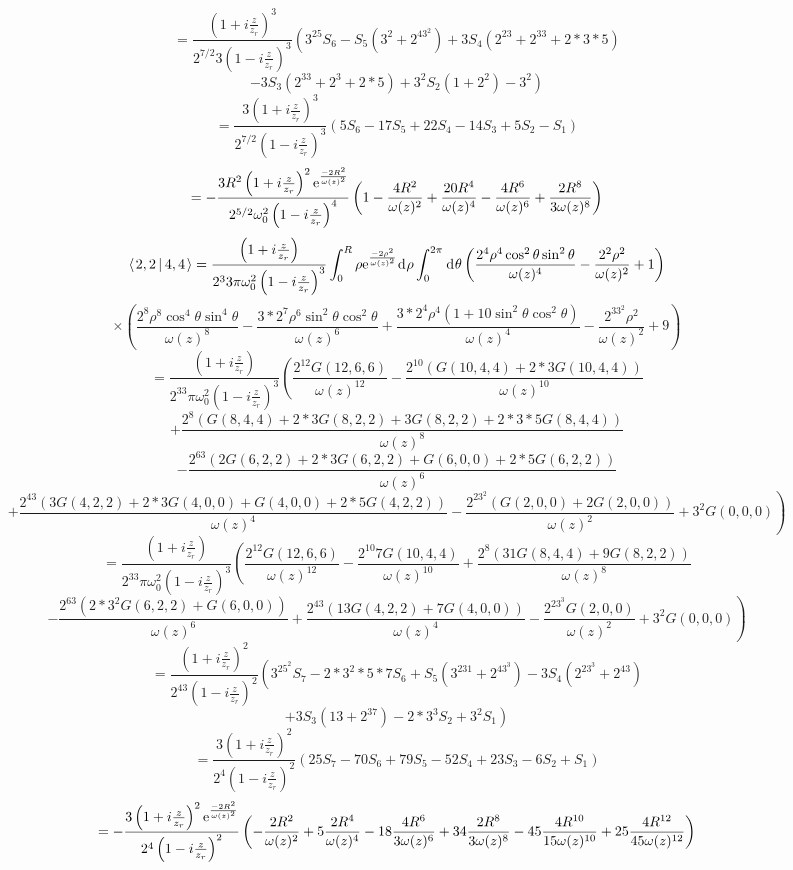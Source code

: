 \documentclass[11pt]{amsart}
\makeatletter
\newcommand{\e}{{\rm e}}				%
\newcommand{\msp}[1]{\mspace{#1mu}}		%
\newcommand{\0}{\varnothing}		%
\newcommand{\dd}{\msp{1} {\rm{d}} \msp{1}}	%
\newcommand{\brac}[2]{\left\langle\msp{2} #1\left\lvert \msp{3.5} #2 \right.\right\rangle}	%
\newcommand{\1}{!}
\newcommand{\2}{@}
\newcommand{\3}{\#}
\newcommand{\4}{\$}
\newcommand{\5}{\%}
\newcommand{\6}{$^\wedge$}
\newcommand{\7}{\&}
\newcommand{\8}{*}
\newcommand{\9}{(}
\makeatother
\begin{document}
\[
=\frac{\left(1+i\frac{z}{z_r}\right)^3}{2^{7/2}3\left(1-i\frac{z}{z_r}\right)^3}\left(3^25S_6-S_5\left(3^2+2^43^2\right)+3S_4\left(2^23+2^33+2*3*5\right)\right.
\]
\[
\left.-3S_3\left(2^33+2^3+2*5\right)+3^2S_2\left(1+2^2\right)-3^2\right)
\]
\[
=\frac{3\left(1+i\frac{z}{z_r}\right)^3}{2^{7/2}\left(1-i\frac{z}{z_r}\right)^3}\left(5S_6-17S_5+22S_4-14S_3+5S_2-S_1\right)
\]
\[
=-\frac{3R^2\left(1+i\frac{z}{z_r}\right)^2\e^{\frac{-2R^2}{\omega(z)^2}}}{2^{5/2}\omega_0^2\left(1-i\frac{z}{z_r}\right)^4}\left(1-\frac{4R^2}{\omega(z)^2}+\frac{20R^4}{\omega(z)^4}-\frac{4R^6}{\omega(z)^6}+\frac{2R^8}{3\omega(z)^8}\right)
\]
\[
\brac{2,2}{4,4} = \frac{\left(1+i\frac{z}{z_r}\right)}{2^33\pi\omega_0^2\left(1-i\frac{z}{z_r}\right)^3}\int_0^R\rho \e^{\frac{-2\rho^2}{\omega(z)^2}}\dd \rho \int_0^{2\pi}\dd \theta\left(\frac{2^4\rho^4\cos^2\theta\sin^2\theta}{\omega(z)^4}-\frac{2^2\rho^2}{\omega(z)^2}+1\right)
\]
\[
\times\left(\frac{2^8\rho^8\cos^4\theta\sin^4\theta}{\omega(z)^8}-\frac{3*2^7\rho^6\sin^2\theta\cos^2\theta}{\omega(z)^6}+\frac{3*2^4\rho^4\left(1+10\sin^2\theta\cos^2\theta\right)}{\omega(z)^4}-\frac{2^33^2\rho^2}{\omega(z)^2}+9\right)
\]
\[
= \frac{\left(1+i\frac{z}{z_r}\right)}{2^33\pi\omega_0^2\left(1-i\frac{z}{z_r}\right)^3}\left(\frac{2^{12}G(12,6,6)}{\omega(z)^{12}}-\frac{2^{10}\left(G(10,4,4)+2*3G(10,4,4)\right)}{\omega(z)^{10}}
\right.
\]
\[
\left.+\frac{2^8\left(G(8,4,4)+2*3G(8,2,2)+3G(8,2,2)+2*3*5G(8,4,4)\right)}{\omega(z)^8}
\right.
\]
\[
\left.-\frac{2^63\left(2G(6,2,2)+2*3G(6,2,2)+G(6,0,0)+2*5G(6,2,2)\right)}{\omega(z)^6}
\right.
\]
\[
\left.+\frac{2^43\left(3G(4,2,2)+2*3G(4,0,0)+G(4,0,0)+2*5G(4,2,2)\right)}{\omega(z)^4}-\frac{2^23^2\left(G(2,0,0)+2G(2,0,0)\right)}{\omega(z)^2}+3^2G(0,0,0)\right)
\]
\[
=\frac{\left(1+i\frac{z}{z_r}\right)}{2^33\pi\omega_0^2\left(1-i\frac{z}{z_r}\right)^3}\left(\frac{2^{12}G(12,6,6)}{\omega(z)^{12}}-\frac{2^{10}7G(10,4,4)}{\omega(z)^{10}}+\frac{2^8\left(31G(8,4,4)+9G(8,2,2)\right)}{\omega(z)^8}
\right.
\]
\[
\left.-\frac{2^63\left(2*3^2G(6,2,2)+G(6,0,0)\right)}{\omega(z)^6}+\frac{2^43\left(13G(4,2,2)+7G(4,0,0)\right)}{\omega(z)^4}-\frac{2^23^3G(2,0,0)}{\omega(z)^2}+3^2G(0,0,0)\right)
\]
\[
=\frac{\left(1+i\frac{z}{z_r}\right)^2}{2^43\left(1-i\frac{z}{z_r}\right)^2}\left(3^25^2S_7-2*3^2*5*7S_6+S_5\left(3^231+2^43^3\right)-3S_4\left(2^23^3+2^43\right)
\right.
\]
\[
\left.+3S_3\left(13+2^37\right)-2*3^3S_2+3^2S_1\right)
\]
\[
=\frac{3\left(1+i\frac{z}{z_r}\right)^2}{2^4\left(1-i\frac{z}{z_r}\right)^2}\left(25S_7-70S_6+79S_5-52S_4+23S_3-6S_2+S_1\right)
\]
\[
=-\frac{3\left(1+i\frac{z}{z_r}\right)^2\e^{\frac{-2R^2}{\omega(z)^2}}}{2^4\left(1-i\frac{z}{z_r}\right)^2}\left(-\frac{2R^2}{\omega(z)^2}+5\frac{2R^4}{\omega(z)^4}-18\frac{4R^6}{3\omega(z)^6}+34\frac{2R^8}{3\omega(z)^8}-45\frac{4R^{10}}{15\omega(z)^{10}}+25\frac{4R^{12}}{45\omega(z)^{12}}\right)
\]
\end{document}
